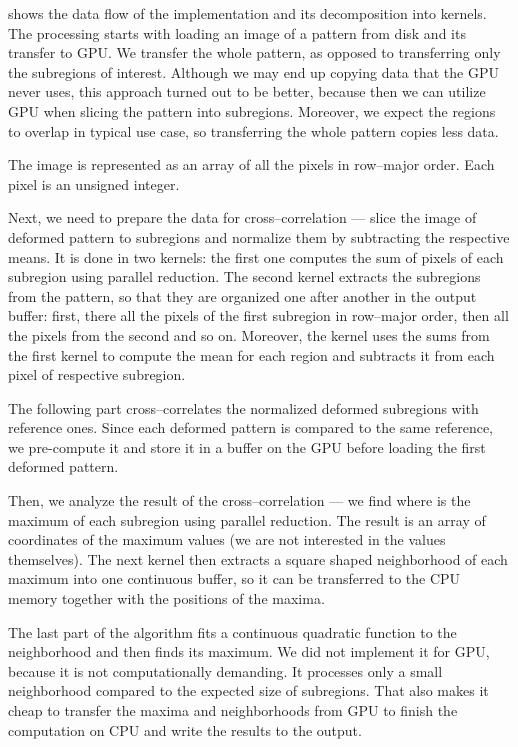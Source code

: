  shows the data flow of the implementation and its decomposition into kernels. The processing starts with loading an image of a pattern from disk and its transfer to GPU. We transfer the whole pattern, as opposed to transferring only the subregions of interest.  Although we may end up copying data that the GPU never uses, this approach turned out to be better, because then we can utilize GPU when slicing the pattern into subregions. Moreover, we expect the regions to overlap in typical use case, so transferring the whole pattern copies less data.

The image is represented as an array of all the pixels in row--major order. Each pixel is an unsigned integer. 

Next, we need to prepare the data for cross--correlation --- slice the image of deformed pattern to subregions and normalize them by subtracting the respective means. It is done in two kernels: the first one computes the sum of pixels of each subregion using parallel reduction. The second kernel extracts the subregions from the pattern, so that they are organized one after another in the output buffer: first, there all the pixels of the first subregion in row--major order, then all the pixels from the second and so on. Moreover, the kernel uses the sums from the first kernel to compute the mean for each region and subtracts it from each pixel of respective subregion.

The following part cross--correlates the normalized deformed subregions with reference ones. Since each deformed pattern is compared to the same reference, we pre-compute it and store it in a buffer on the GPU before loading the first deformed pattern.

Then, we analyze the result of the cross--correlation --- we find where is the maximum of each subregion using parallel reduction. The result is an array of coordinates of the maximum values (we are not interested in the values themselves). The next kernel then extracts a square shaped neighborhood of each maximum into one continuous buffer, so it can be transferred to the CPU memory together with the positions of the maxima.

The last part of the algorithm fits a continuous quadratic function to the neighborhood and then finds its maximum. We did not implement it for GPU, because it is not computationally demanding. It processes only a small neighborhood compared to the expected size of subregions. That also makes it cheap to transfer the maxima and neighborhoods from GPU to finish the computation on CPU and write the results to the output.

